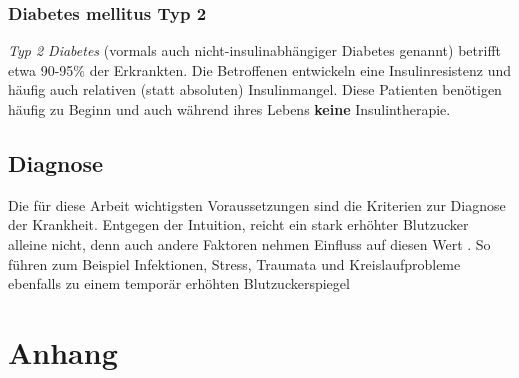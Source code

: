 \documentclass[11.5pt]{article}
\begin{document}
\subsubsection{Diabetes mellitus Typ 2}


\textit{Typ 2 Diabetes} (vormals auch \glqq nicht-insulinabhängiger Diabetes genannt\grqq{}) betrifft etwa 90-95\% der Erkrankten. Die Betroffenen entwickeln eine Insulinresistenz und häufig auch relativen (statt absoluten) Insulinmangel. Diese Patienten benötigen häufig zu Beginn und auch während ihres Lebens \textbf{keine} Insulintherapie. \cite[p.~63]{ada}

\newpage

\subsection{Diagnose}


Die für diese Arbeit wichtigsten Voraussetzungen sind die Kriterien zur Diagnose der Krankheit. Entgegen der Intuition, reicht ein stark erhöhter Blutzucker alleine nicht, denn auch andere Faktoren nehmen Einfluss auf diesen Wert \cite[p.~540]{who}. So führen zum Beispiel Infektionen, Stress, Traumata und Kreislaufprobleme ebenfalls zu einem temporär erhöhten Blutzuckerspiegel \cite[p.~540]{who}


\newpage

\appendix
\section{Anhang}

\newpage

\printbibliography
\end{document}
